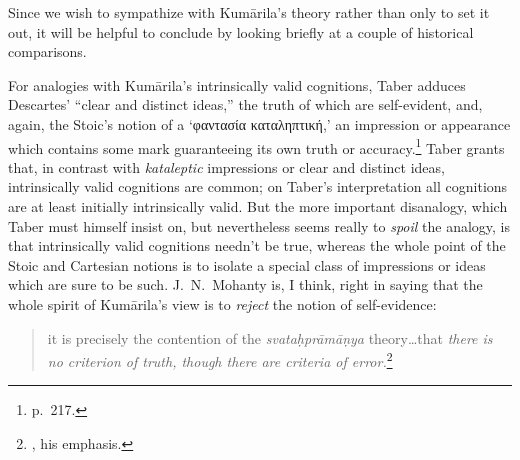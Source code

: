 \documentclass[11pt,letterpaper,oneside]{amsart}
\newcommand{\g}{\textgreek}
\newcommand{\e}{\emph}
\newenvironment{squote}{\begin{quote}\sf\small}{\rm\end{quote}} %
\newcommand{\kum}{Kum\={a}rila}
\begin{document}



Since we wish to sympathize with \kum's theory rather than only to set it out, it will be helpful to conclude by looking briefly at a couple of historical comparisons.

For analogies with \kum's intrinsically valid cognitions, Taber adduces Descartes' ``clear and distinct ideas,'' the truth of which are self-evident, and, again, the Stoic's notion of a `\g{φαντασία καταληπτική},' an impression or appearance which contains some mark guaranteeing its own truth or accuracy.\footnote{p.\ 217.} Taber grants that, in contrast with \e{kataleptic} impressions or clear and distinct ideas, intrinsically valid cognitions are common; on Taber's interpretation all cognitions are at least initially intrinsically valid. But the more important disanalogy, which Taber must himself insist on, but nevertheless seems really to \emph{spoil} the analogy, is that intrinsically valid cognitions needn't be true, whereas the whole point of the Stoic and Cartesian notions is to isolate a special class of impressions or ideas which are sure to be such. J.~N.~Mohanty is, I think, right in saying that the whole spirit of Kum\=arila's view is to \e{reject} the notion of self-evidence: \begin{squote}it is precisely the contention of the \emph{svata\d hpr\=am\=a\d nya} theory\ldots that \emph{there is no criterion of truth, though there are criteria of error.}\footnote{\citet[p.\ 22]{mohanty1989gangesa}, his emphasis.}\end{squote}


\end{document}
